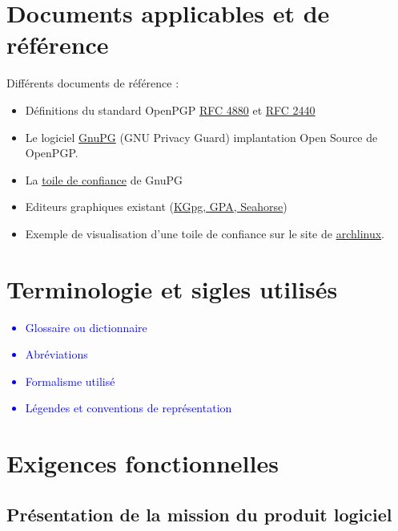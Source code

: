 \documentclass{univ-projet}
\begin{document}
\section{Documents applicables et de référence}
Différents documents de référence :
\begin{itemize}
\item Définitions du standard OpenPGP \href{file:../../ressources/openPGP/rfc4880-en.pdf}{RFC 4880}
  et \href{file:../../ressources/openPGP/rfc2440-fr.pdf}{RFC 2440}
\item Le logiciel \href{https://www.gnupg.org/}{GnuPG} (GNU Privacy Guard) implantation Open Source
  de OpenPGP.
\item La \href{https://www.gnupg.org/gph/fr/manual.html#AEN541}{toile de confiance} de GnuPG
\item Editeurs graphiques existant 
  (\href{http://www.gnupg.org/related_software/frontends.en.html}{KGpg, GPA, Seahorse})
\item Exemple de visualisation d'une toile de confiance sur le site de 
  \href{https://www.archlinux.org/master-keys/#visualization}{archlinux}.
\end{itemize}

\section{Terminologie et sigles utilisés}
\textcolor{blue}{
  \begin{itemize}
  \item Glossaire ou dictionnaire
  \item Abréviations
  \item Formalisme utilisé
  \item Légendes et conventions de représentation
  \end{itemize}
}

\section{Exigences fonctionnelles}
\subsection{Présentation de la mission du produit logiciel}
\end{document}
